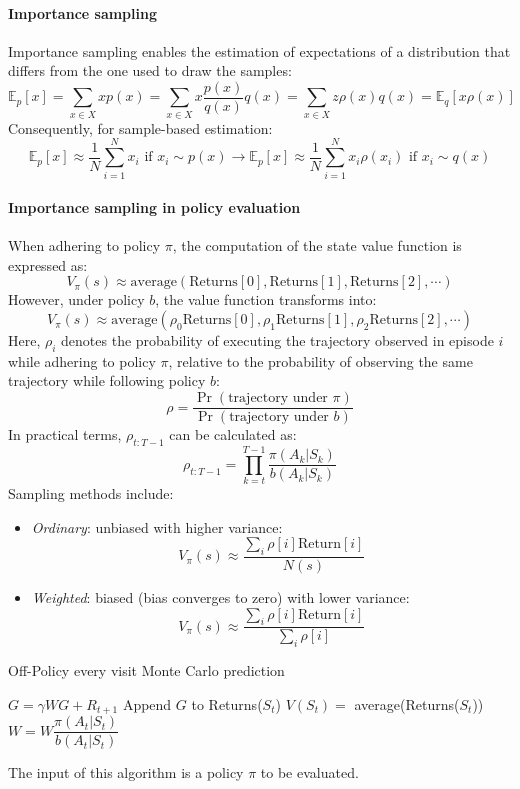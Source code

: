 \paragraph*{Importance sampling}
Importance sampling enables the estimation of expectations of a distribution that differs from the one used to draw the samples:
\[\mathbb{E}_p[x]=\sum_{x\in X}xp(x)=\sum_{x\in X}x\dfrac{p(x)}{q(x)}q(x)=\sum_{x\in X}z\rho(x)q(x)=\mathbb{E}_q[x\rho(x)]\]
Consequently, for sample-based estimation:
\[\mathbb{E}_p[x]\approx\dfrac{1}{N}\sum_{i=1}^{N}x_i\text{ if }x_i\sim p(x)\rightarrow \mathbb{E}_p[x]\approx\dfrac{1}{N}\sum_{i=1}^{N}x_i\rho(x_i)\text{ if }x_i\sim q(x)\]

\paragraph*{Importance sampling in policy evaluation}
When adhering to policy $\pi$, the computation of the state value function is expressed as:
\[V_{\pi}(s)\approx\text{average}(\text{Returns}[0],\text{Returns}[1],\text{Returns}[2],\cdots)\]
However, under policy $b$, the value function transforms into:
\[V_{\pi}(s)\approx\text{average}(\rho_0\text{Returns}[0],\rho_1\text{Returns}[1],\rho_2\text{Returns}[2],\cdots)\]
Here, $\rho_i$ denotes the probability of executing the trajectory observed in episode $i$ while adhering to policy $\pi$, relative to the probability of observing the same trajectory while following policy $b$:
\[\rho=\dfrac{\Pr(\text{trajectory under }\pi)}{\Pr(\text{trajectory under }b)}\]
In practical terms, $\rho_{t:T-1}$ can be calculated as:
\[\rho_{t:T-1}=\prod_{k=t}^{T-1}\dfrac{\pi(A_k|S_k)}{b(A_k|S_k)}\]
Sampling methods include:
\begin{itemize}
    \item \textit{Ordinary}: unbiased with higher variance:
        \[V_{\pi}(s)\approx\dfrac{\sum_i\rho[i]\text{Return}[i]}{N(s)}\]
    \item \textit{Weighted}: biased (bias converges to zero) with lower variance:
    \[V_{\pi}(s)\approx\dfrac{\sum_i\rho[i]\text{Return}[i]}{\sum_i\rho[i]}\]
\end{itemize}

\begin{algorithm}[H]
    \caption{Off-Policy every visit Monte Carlo prediction}
        \begin{algorithmic}[1]
                    \State $G=\gamma WG + R_{t+1}$
                    \State Append $G$ to Returns($S_t$)
                    \State $V(S_t)=$ average(Returns($S_t$))
                    \State $W=W \dfrac{\pi(A_t | S_t)}{b(A_t | S_t)}$
                \EndFor
            \EndFor
        \end{algorithmic}
\end{algorithm}
The input of this algorithm is a policy $\pi$ to be evaluated.